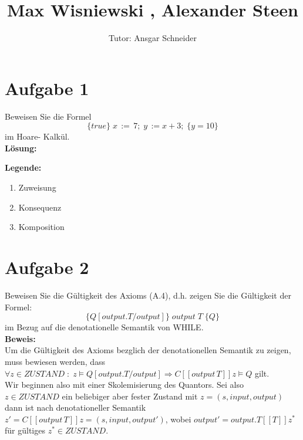 \documentclass[11pt,a4paper,ngerman]{article}
\author{Tutor: Ansgar Schneider}
\date{}
\title{Max Wisniewski , Alexander Steen}
\begin{document}

\maketitle
\thispagestyle{fancy}



\section*{Aufgabe 1}
Beweisen Sie die Formel
$$
    \{true\} \; x \, := \,7; \; y \, := x + 3; \;\{y=10\}
$$
im Hoare- Kalkül.\\
\textbf{Lösung:}\\
\begin{prooftree}
\end{prooftree}

\textbf{Legende:}
\begin{enumerate}[(1)]
    \item Zuweisung
    \item Konsequenz
    \item Komposition
\end{enumerate}
\section*{Aufgabe 2}
Beweisen Sie die Gültigkeit des Axioms (A.4), d.h. zeigen Sie die Gültigkeit
der Formel:
$$
    \{Q[output.T/output]\} \; output \; T \; \{Q\}
$$
im Bezug auf die denotationelle Semantik von WHILE.\\

\textbf{Beweis:}\\
Um die Gültigkeit des Axioms bezglich der denotationellen Semantik zu zeigen, muss
bewiesen werden, dass
$\forall z \in ZUSTAND \; : \; z \models Q[output.T/output] \Rightarrow C[\![output \, T ]\!] z \models Q$
gilt.\\
Wir beginnen also mit einer Skolemisierung des Quantors. Sei also $z\in ZUSTAND$ ein beliebiger
aber fester Zustand mit $z=(s,input,output)$ dann ist nach denotationeller Semantik 
$z' = C[\![ output \, T ]\!] z = (s,input,output')$, wobei $output' = output.T[\![T]\!] z^{*}$ für gültiges $z^{*} \in ZUSTAND$. \\
\end{document}
